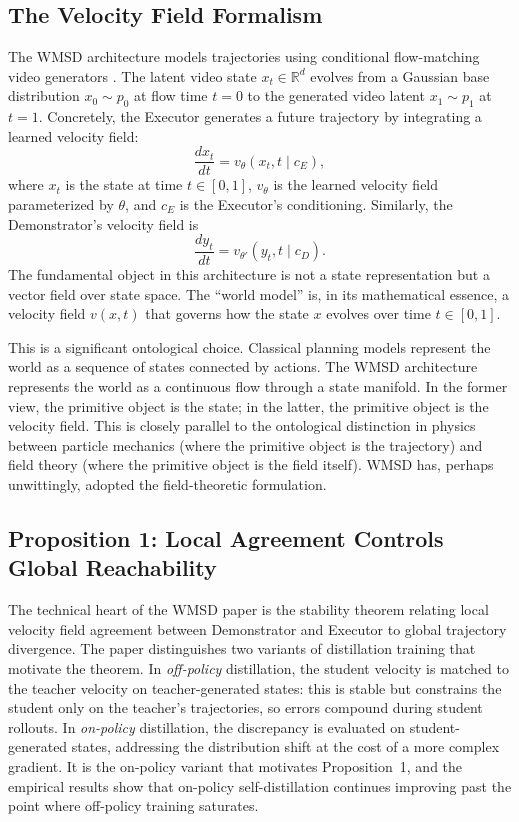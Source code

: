 \documentclass[12pt, a4paper]{article}
\theoremstyle{plain}
\theoremstyle{definition}
\theoremstyle{remark}
\newcommand{\R}{\mathbb{R}}
\begin{document}
\subsection{The Velocity Field Formalism}

The WMSD architecture models trajectories using conditional flow-matching
video generators \cite{stapf2026wmsd}. The latent video state $x_t \in
\R^d$ evolves from a Gaussian base distribution $x_0 \sim p_0$ at flow
time $t = 0$ to the generated video latent $x_1 \sim p_1$ at $t = 1$.
Concretely, the Executor generates a future trajectory by integrating a
learned velocity field:
\begin{equation}
  \frac{d x_t}{dt} = v_\theta(x_t, t \mid c_E),
\end{equation}
where $x_t$ is the state at time $t \in [0,1]$, $v_\theta$ is the learned
velocity field parameterized by $\theta$, and $c_E$ is the Executor's
conditioning. Similarly, the Demonstrator's velocity field is
\begin{equation}
  \frac{d y_t}{dt} = v_{\theta'}(y_t, t \mid c_D).
\end{equation}
The fundamental object in this architecture is not a state representation but
a vector field over state space. The ``world model'' is, in its mathematical
essence, a velocity field $v(x,t)$ that governs how the state $x$ evolves
over time $t \in [0,1]$.

This is a significant ontological choice. Classical planning models represent
the world as a sequence of states connected by actions. The WMSD architecture
represents the world as a continuous flow through a state manifold. In the
former view, the primitive object is the state; in the latter, the primitive
object is the velocity field. This is closely parallel to the ontological
distinction in physics between particle mechanics (where the primitive object
is the trajectory) and field theory (where the primitive object is the field
itself). WMSD has, perhaps unwittingly, adopted the field-theoretic
formulation.

\subsection{Proposition 1: Local Agreement Controls Global Reachability}

The technical heart of the WMSD paper is the stability theorem relating local
velocity field agreement between Demonstrator and Executor to global trajectory
divergence. The paper distinguishes two variants of distillation training that
motivate the theorem. In \emph{off-policy} distillation, the student velocity
is matched to the teacher velocity on teacher-generated states: this is stable
but constrains the student only on the teacher's trajectories, so errors
compound during student rollouts. In \emph{on-policy} distillation, the
discrepancy is evaluated on student-generated states, addressing the
distribution shift at the cost of a more complex gradient. It is the on-policy
variant that motivates Proposition~1, and the empirical results show that
on-policy self-distillation continues improving past the point where
off-policy training saturates.
\end{document}
